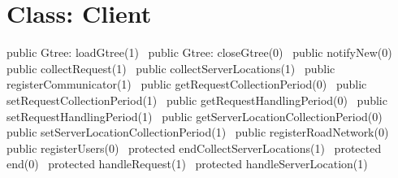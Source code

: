 \section*{Class: Client}
\nwenddocs{}\endmoddef{}
\nwendcode{}\nwdocspar
{}
\nwenddocs{}\plusendmoddef
\nwendcode{}\nwdocspar
{}
\nwenddocs{}\plusendmoddef
public \LA{}Gtree: loadGtree(1)~{\nwtagstyle{}}\RA{}
public \LA{}Gtree: closeGtree(0)~{\nwtagstyle{}}\RA{}
public \LA{}notifyNew(0)~{\nwtagstyle{}}\RA{}
public \LA{}collectRequest(1)~{\nwtagstyle{}}\RA{}
public \LA{}collectServerLocations(1)~{\nwtagstyle{}}\RA{}
public \LA{}registerCommunicator(1)~{\nwtagstyle{}}\RA{}
public \LA{}getRequestCollectionPeriod(0)~{\nwtagstyle{}}\RA{}
public \LA{}setRequestCollectionPeriod(1)~{\nwtagstyle{}}\RA{}
public \LA{}getRequestHandlingPeriod(0)~{\nwtagstyle{}}\RA{}
public \LA{}setRequestHandlingPeriod(1)~{\nwtagstyle{}}\RA{}
public \LA{}getServerLocationCollectionPeriod(0)~{\nwtagstyle{}}\RA{}
public \LA{}setServerLocationCollectionPeriod(1)~{\nwtagstyle{}}\RA{}
public \LA{}registerRoadNetwork(0)~{\nwtagstyle{}}\RA{}
public \LA{}registerUsers(0)~{\nwtagstyle{}}\RA{}
protected \LA{}endCollectServerLocations(1)~{\nwtagstyle{}}\RA{}
protected \LA{}end(0)~{\nwtagstyle{}}\RA{}
protected \LA{}handleRequest(1)~{\nwtagstyle{}}\RA{}
protected \LA{}handleServerLocation(1)~{\nwtagstyle{}}\RA{}
\nwendcode{}\nwdocspar

